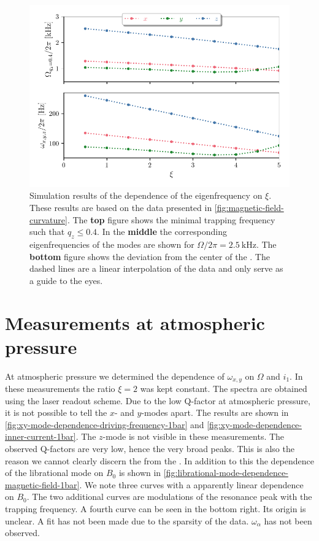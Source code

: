 \begin{figure}
    \centering
    \includegraphics{figures/data/eigen_frequency_xi_dependence.pdf}
    \caption{Simulation results of the dependence of the eigenfrequency on $\xi$. These results are based on the data presented in \autoref{fig:magnetic-field-curvature}. The \textbf{top} figure shows the minimal trapping frequency such that $q_z \leq 0.4$. In the \textbf{middle} the corresponding eigenfrequencies of the modes are shown for $\Omega / 2\pi = \qty{2.5}{\kilo\hertz}$. The \textbf{bottom} figure shows the deviation from the center of the \ymode. The dashed lines are a linear interpolation of the data and only serve as a guide to the eyes.}
    \label{fig:eigen-frequency-xi-dependence}
\end{figure}

\section{Measurements at atmospheric pressure}
\label{sec:measurements-at-atmospheric-pressure}
At atmospheric pressure we determined the dependence of $\omega_{x,y}$ on $\Omega$ and $i_1$. In these measurements the ratio $\xi=2$ was kept constant. The spectra are obtained using the laser readout scheme. Due to the low Q-factor at atmospheric pressure, it is not possible to tell the $x$- and $y$-modes apart. The results are shown in \autoref{fig:xy-mode-dependence-driving-frequency-1bar} and \autoref{fig:xy-mode-dependence-inner-current-1bar}. The $z$-mode is not visible in these measurements. The observed Q-factors are very low, hence the very broad peaks. This is also the reason we cannot clearly discern the \xmode from the \ymode. In addition to this the dependence of the librational mode on $B_0$ is shown in \autoref{fig:librational-mode-dependence-magnetic-field-1bar}. We note three curves with a apparently linear dependence on $B_0$. The two additional curves are modulations of the resonance peak with the trapping frequency. A fourth curve can be seen in the bottom right. Its origin is unclear. A fit has not been made due to the sparsity of the data. $\omega_\alpha$ has not been observed.

